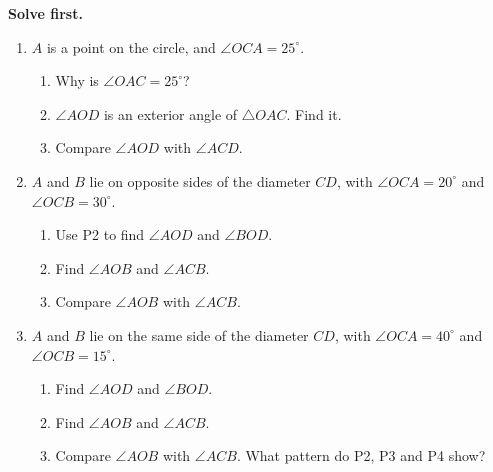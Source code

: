 \documentclass[11pt,a4paper]{article}
\theoremstyle{branddef}
\newcommand{\tr}{\triangle}
\newcounter{prob}
\newenvironment{solvefirst}
  {\par\smallskip\noindent\textbf{Solve first.}
   \begin{enumerate}[label=\textbf{P\arabic*.},leftmargin=2.2em,itemsep=3pt,start=\numexpr\value{prob}+1\relax]}
  {\setcounter{prob}{\value{enumi}}\end{enumerate}}
\begin{document}
\begin{solvefirst}
  \item $A$ is a point on the circle, and $\angle OCA=25^\circ$.
  \begin{enumerate}[label=(\alph*),itemsep=1pt]
    \item Why is $\angle OAC=25^\circ$?
    \item $\angle AOD$ is an exterior angle of $\tr OAC$. Find it.
    \item Compare $\angle AOD$ with $\angle ACD$.
  \end{enumerate}
  \item $A$ and $B$ lie on opposite sides of the diameter $CD$, with $\angle OCA=20^\circ$ and $\angle OCB=30^\circ$.
  \begin{enumerate}[label=(\alph*),itemsep=1pt]
    \item Use P2 to find $\angle AOD$ and $\angle BOD$.
    \item Find $\angle AOB$ and $\angle ACB$.
    \item Compare $\angle AOB$ with $\angle ACB$.
  \end{enumerate}
  \item $A$ and $B$ lie on the same side of the diameter $CD$, with $\angle OCA=40^\circ$ and $\angle OCB=15^\circ$.
  \begin{enumerate}[label=(\alph*),itemsep=1pt]
    \item Find $\angle AOD$ and $\angle BOD$.
    \item Find $\angle AOB$ and $\angle ACB$.
    \item Compare $\angle AOB$ with $\angle ACB$. What pattern do P2, P3 and P4 show?
  \end{enumerate}
\end{solvefirst}
\end{document}
